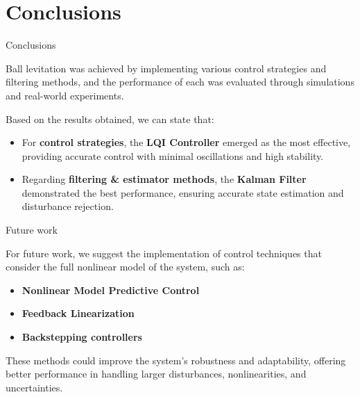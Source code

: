 \section{Conclusions}

\begin{frame}{Conclusions}

    Ball levitation was achieved by implementing various control strategies and filtering methods, and the performance of each was evaluated through simulations and real-world experiments.

    \vspace{9pt}

    Based on the results obtained, we can state that:

    \begin{itemize}
        \item For \textbf{control strategies}, the \textbf{LQI Controller} emerged as the most effective, providing accurate control with minimal oscillations and high stability.
        \item Regarding \textbf{filtering \& estimator methods}, the \textbf{Kalman Filter} demonstrated the best performance, ensuring accurate state estimation and disturbance rejection.
    \end{itemize}

\end{frame}



\begin{frame}{Future work}

    For future work, we suggest the implementation of control techniques that consider the full nonlinear model of the system, such as:

    \begin{itemize}
        \item \textbf{Nonlinear Model Predictive Control}
        \item \textbf{Feedback Linearization}
        \item \textbf{Backstepping controllers}
    \end{itemize}

    These methods could improve the system's robustness and adaptability, offering better performance in handling larger disturbances, nonlinearities, and uncertainties.

\end{frame}
